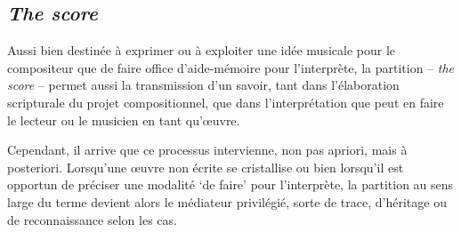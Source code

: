 \documentclass{article}
\begin{document}
%
%
%
%
%
%
%
%
%
%
%
%

\subsection{\textsl{The score}}

Aussi bien destinée à exprimer ou à exploiter une idée musicale pour le compositeur que de faire office d'aide-mémoire pour l'interprète, la partition -- \textsl{the score} -- permet aussi la transmission d'un savoir, tant dans l'élaboration scripturale du projet compositionnel, que dans l'interprétation que peut en faire le lecteur ou le musicien en tant qu'œuvre.


Cependant, il arrive que ce processus intervienne, non pas apriori, mais à posteriori. Lorsqu'une œuvre non écrite se cristallise ou bien lorsqu'il est opportun de préciser une modalité `de faire' pour l'interprète, la partition au sens large du terme devient alors le médiateur privilégié, sorte de trace, d'héritage ou de reconnaissance selon les cas.
\end{document}
